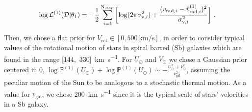 \begin{equation}\label{Eq:LogLikeMod1}
    \log \mathcal{L}^{(1)}(\mathcal{D} \vert \theta_1) = -\frac{1}{2}\sum_{i=1}^{\text{N}_{\text{stars}}}\biggl[\log(2\pi\sigma_{\text{v},i}^2)+\frac{(v_{\text{rad},i} - \hat{v}_{\text{rad},i}^{(1)})^2}{\sigma_{\text{v},i}^2}\biggr] \text{ .}
\end{equation}

Then, we chose a flat prior for $V_{\text{rot}}\in[0,\qty{500}{\kilo\meter\per\second}]$, in order to consider typical values of the rotational motion of stars in spiral barred (Sb) galaxies which are found in the range [144,~330]~\unit{\kilo\meter\per\second}\cite{Schneider2015}. 
For $U_\odot$ and $V_\odot$ we chose a Gaussian prior centered in 0, $\log\mathbb{P}^{(1)}(U_\odot) + \log\mathbb{P}^{(1)}(U_\odot) \sim - \frac{U_\odot^2 + V_{\odot}^2}{v_{\text{gal}}^2}$, assuming the peculiar motion of the Sun to be analogous to a stochastic thermal motion. 
As a value for $v_{\text{gal}}$, we chose 200~\unit{\kilo\meter\per\second} since it is the typical scale of stars' velocities in a Sb galaxy.

